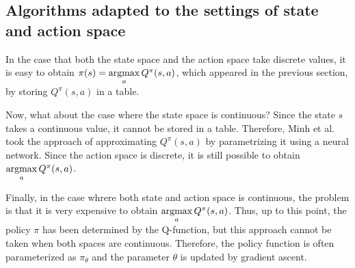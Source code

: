 \documentclass[english, dvipdfmx]{ampmt}             %
\newcommand{\argmax}{\mathop{\rm argmax}\limits}
\begin{document}
\subsection{Algorithms adapted to the settings of state and action space}
\label{sec:policy_improvement}
In the case that both the state space and the action space take discrete values, it is easy to obtain
$\pi(s)=\argmax_aQ^{\pi}(s,a)$, which appeared in the previous section, by storing $Q^{\pi}(s,a)$ in a table.\par
Now, what about the case where the state space is continuous? Since the state $s$ takes a continuous value, it cannot be stored in a table. Therefore, Minh et al.\cite{DQN} took the approach of approximating $Q^{\pi}(s,a)$ by parametrizing it using a neural network. Since the action space is discrete, it is still possible to obtain $\argmax_aQ^{\pi}(s,a)$. \par
Finally, in the case whrere both state and action space is continuous, the problem is that it is very expensive to obtain $\argmax_aQ^{\pi}(s,a)$. Thus, up to this point, the policy $\pi$ has been determined by the Q-function, but this approach cannot be taken when both spaces are continuous. 
Therefore, the policy function is often parameterized as $\pi_{\theta}$ and the parameter $\theta$ is updated by gradient ascent. 
\end{document}

